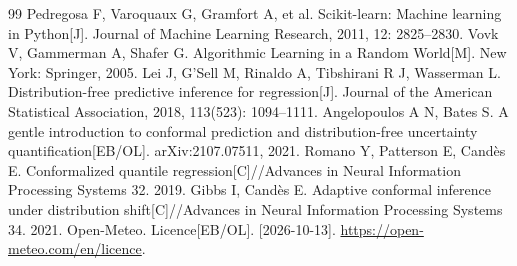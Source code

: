\documentclass[UTF8,a4paper,11pt,fontset=fandol]{ctexart}
\begin{document}
\begin{thebibliography}{99}
 Pedregosa F, Varoquaux G, Gramfort A, et al. Scikit-learn: Machine learning in Python[J]. Journal of Machine Learning Research, 2011, 12: 2825--2830.
 Vovk V, Gammerman A, Shafer G. Algorithmic Learning in a Random World[M]. New York: Springer, 2005.
 Lei J, G'Sell M, Rinaldo A, Tibshirani R J, Wasserman L. Distribution-free predictive inference for regression[J]. Journal of the American Statistical Association, 2018, 113(523): 1094--1111.
 Angelopoulos A N, Bates S. A gentle introduction to conformal prediction and distribution-free uncertainty quantification[EB/OL]. arXiv:2107.07511, 2021.
 Romano Y, Patterson E, Cand\`es E. Conformalized quantile regression[C]//Advances in Neural Information Processing Systems 32. 2019.
 Gibbs I, Cand\`es E. Adaptive conformal inference under distribution shift[C]//Advances in Neural Information Processing Systems 34. 2021.
 Open-Meteo. Licence[EB/OL]. [2026-10-13]. \url{https://open-meteo.com/en/licence}.
\end{thebibliography}
\end{document}
